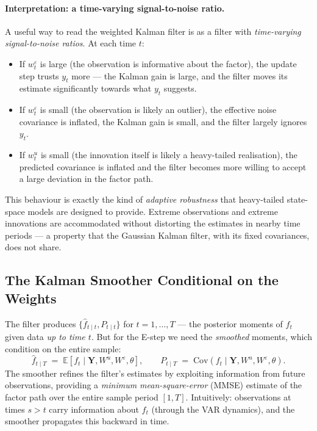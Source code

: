 \documentclass[11pt, a4paper, oneside]{article}
\newcommand{\mY}{\mathbf{Y}}
\begin{document}
\paragraph{Interpretation: a time-varying signal-to-noise ratio.}
A useful way to read the weighted Kalman filter is as a filter with
\emph{time-varying signal-to-noise ratios}. At each time $t$:
\begin{itemize}[leftmargin=1.5em, itemsep=3pt]
    \item If $w^\varepsilon_t$ is large (the observation is informative
          about the factor), the update step trusts $y_t$ more — the
          Kalman gain is large, and the filter moves its estimate
          significantly towards what $y_t$ suggests.
    \item If $w^\varepsilon_t$ is small (the observation is likely an
          outlier), the effective noise covariance is inflated, the
          Kalman gain is small, and the filter largely ignores $y_t$.
    \item If $w^u_t$ is small (the innovation itself is likely a
          heavy-tailed realisation), the predicted covariance is
          inflated and the filter becomes more willing to accept a
          large deviation in the factor path.
\end{itemize}
This behaviour is exactly the kind of \emph{adaptive robustness} that
heavy-tailed state-space models are designed to provide. Extreme
observations and extreme innovations are accommodated without
distorting the estimates in nearby time periods — a property that the
Gaussian Kalman filter, with its fixed covariances, does not share.

\subsection{The Kalman Smoother Conditional on the Weights}
\label{subsec:kalman-smoother}

The filter produces $\{\hat{f}_{t \mid t}, P_{t \mid t}\}$ for
$t = 1, \ldots, T$ — the posterior moments of $f_t$ given data
\emph{up to time $t$}. But for the E-step we need the \emph{smoothed}
moments, which condition on the entire sample:
\[
\hat{f}_{t \mid T} \;=\; \mathbb{E}[f_t \mid \mY, W^u, W^\varepsilon, \theta],
\qquad
P_{t \mid T} \;=\; \mathrm{Cov}(f_t \mid \mY, W^u, W^\varepsilon, \theta).
\]
The smoother refines the filter's estimates by exploiting information
from future observations, providing a \emph{minimum mean-square-error}
(MMSE) estimate of the factor path over the entire sample period
$[1, T]$. Intuitively: observations at times $s > t$ carry information
about $f_t$ (through the VAR dynamics), and the smoother propagates
this backward in time.
\end{document}

